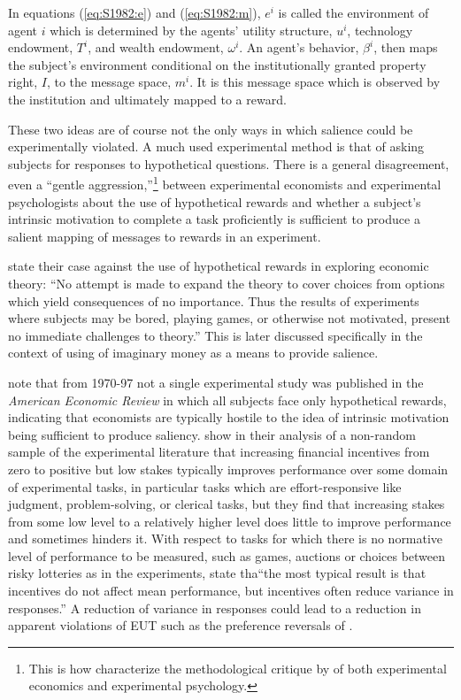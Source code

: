 \documentclass[../main.tex]{subfiles}
\begin{document}
In equations (\ref{eq:S1982:e}) and (\ref{eq:S1982:m}), $e^i$ is called the environment of agent $i$ which is determined by the agents' utility structure, $u^i$, technology endowment, $T^i$, and wealth endowment, $\omega^i$.
An agent's behavior, $\beta^i$, then maps the subject's environment conditional on the institutionally granted property right, $I$, to the message space, $m^i$.
It is this message space which is observed by the institution and ultimately mapped to a reward.

These two ideas are of course not the only ways in which salience could be experimentally violated.
A much used experimental method is that of asking subjects for responses to hypothetical questions.
There is a general disagreement, even a \enquote{gentle aggression,}\footnote{This is how \textcite{Hertwig2001} characterize the methodological critique by \textcite{Smith1982} of both experimental economics and experimental psychology.} between experimental economists and experimental psychologists about the use of hypothetical rewards and whether a subject's intrinsic motivation to complete a task proficiently is sufficient to produce a salient mapping of messages to  rewards in an experiment.

\textcite[624]{Grether1979} state their case against the use of hypothetical rewards in exploring economic theory:
\enquote{No attempt is made to expand the theory to cover choices from options which yield consequences of no importance.\textelp{} Thus the results of experiments where subjects may be bored, playing games, or otherwise not motivated, present no immediate challenges to theory.}
This is later discussed specifically in the context of using of imaginary money as a means to provide salience.

\textcite[31]{Camerer1999} note that from 1970-97 not a single experimental study was published in the \textit{American Economic Review} in which all subjects face only hypothetical rewards, indicating that economists are typically hostile to the idea of intrinsic motivation being sufficient to produce saliency.
\textcite{Camerer1999} show in their analysis of a non-random sample of the experimental literature that increasing financial incentives from zero to positive but low stakes typically improves performance over some domain of experimental tasks, in particular tasks which are effort-responsive like judgment, problem-solving, or clerical tasks, but they find that increasing stakes from some low level to a relatively higher level does little to improve performance and sometimes hinders it.
With respect to tasks for which there is no normative level of performance to be measured, such as games, auctions or choices between risky lotteries as in the \textcite{Grether1979} experiments, \textcite[34]{Camerer1999} state tha\enquote{the most typical result is that incentives do not affect mean performance, but incentives often reduce variance in responses.}
A reduction of variance in responses could lead to a reduction in apparent violations of EUT such as the preference reversals of \textcite{Grether1979}.
\end{document}

